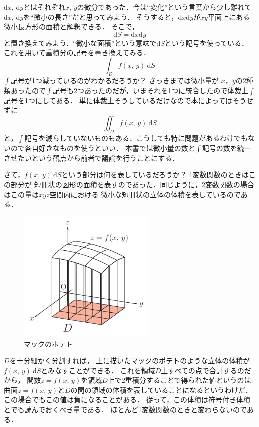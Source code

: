 $\mathrm{d}x, \, \mathrm{d}y$とはそれぞれ$x, \, y$の微分であった．今は``変化''という言葉から少し離れて
$\mathrm{d}x, \, \mathrm{d}y$を``微小の長さ''だと思ってみよう．
そうすると，$\mathrm{d}x\mathrm{d}y$が$xy$平面上にある微小長方形の面積と解釈できる．
そこで，
$$
\mathrm{d}S = \mathrm{d}x\mathrm{d}y
$$
と置き換えてみよう．``微小な面積''という意味で$\mathrm{d}S$という記号を使っている．
これを用いて重積分の記号を書き換えてみる．
$$
\int_{D} f(x, \, y) \: \mathrm{d}S
$$
$\int$記号が1つ減っているのがわかるだろうか？ さっきまでは微小量が
$x$，$y$の2種類あったので$\int$記号も2つあったのだが，いまそれを1つに統合したので体裁上$\int$記号を1つにしてある．
単に体裁上そうしているだけなので本によってはそうせずに
$$
\iint_{D} f(x, \, y) \: \mathrm{d}S
$$
と，$\int$記号を減らしていないものもある．こうしても特に問題があるわけでもないので各自好きなものを使うといい．
本書では微小量の数と$\int$記号の数を統一させたいという観点から前者で議論を行うことにする．

さて，$f(x, \, y) \: \mathrm{d}S$という部分は何を表しているだろうか？ 1変数関数のときはこの部分が
短冊状の図形の面積を表すのであった．同じように，2変数関数の場合はこの量は$xyz$空間内における
微小な短冊状の立体の体積を表しているのである．
\begin{figure}[h]
 \centering
 \includegraphics[width=6.5cm]{picture/juusekibun1.pdf} 
 \caption{マックのポテト}
\end{figure}

$D$を十分細かく分割すれば，
上に描いたマックのポテトのような立体の体積が$f(x, \, y)\:\mathrm{d}S$とみなすことができる．
これを領域$D$上すべての点で合計するのだから，
関数$z=f(x, \, y)$を領域$D$上で2重積分することで得られた値というのは
曲面$z=f(x, \, y)$と$D$の間の領域の体積を表していることになるというわけだ．
この場合でもこの値は負になることがある．
従って，この体積は符号付き体積とでも読んでおくべき量である．
ほとんど1変数関数のときと変わらないのである．

